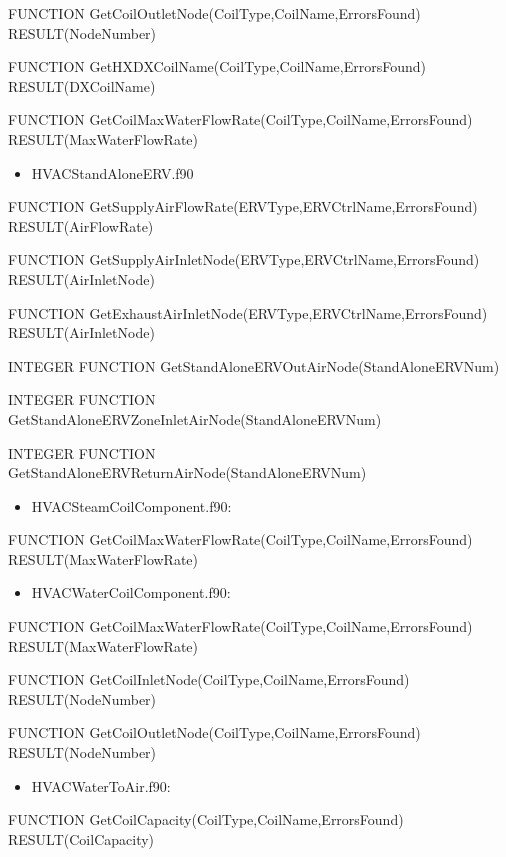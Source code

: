 FUNCTION GetCoilOutletNode(CoilType,CoilName,ErrorsFound) RESULT(NodeNumber)

FUNCTION GetHXDXCoilName(CoilType,CoilName,ErrorsFound) RESULT(DXCoilName)

FUNCTION GetCoilMaxWaterFlowRate(CoilType,CoilName,ErrorsFound) RESULT(MaxWaterFlowRate)

\begin{itemize}
\tightlist
\item
  HVACStandAloneERV.f90
\end{itemize}

FUNCTION GetSupplyAirFlowRate(ERVType,ERVCtrlName,ErrorsFound) RESULT(AirFlowRate)

FUNCTION GetSupplyAirInletNode(ERVType,ERVCtrlName,ErrorsFound) RESULT(AirInletNode)

FUNCTION GetExhaustAirInletNode(ERVType,ERVCtrlName,ErrorsFound) RESULT(AirInletNode)

INTEGER FUNCTION GetStandAloneERVOutAirNode(StandAloneERVNum)

INTEGER FUNCTION GetStandAloneERVZoneInletAirNode(StandAloneERVNum)

INTEGER FUNCTION GetStandAloneERVReturnAirNode(StandAloneERVNum)

\begin{itemize}
\tightlist
\item
  HVACSteamCoilComponent.f90:
\end{itemize}

FUNCTION GetCoilMaxWaterFlowRate(CoilType,CoilName,ErrorsFound) RESULT(MaxWaterFlowRate)

\begin{itemize}
\tightlist
\item
  HVACWaterCoilComponent.f90:
\end{itemize}

FUNCTION GetCoilMaxWaterFlowRate(CoilType,CoilName,ErrorsFound) RESULT(MaxWaterFlowRate)

FUNCTION GetCoilInletNode(CoilType,CoilName,ErrorsFound) RESULT(NodeNumber)

FUNCTION GetCoilOutletNode(CoilType,CoilName,ErrorsFound) RESULT(NodeNumber)

\begin{itemize}
\tightlist
\item
  HVACWaterToAir.f90:
\end{itemize}

FUNCTION GetCoilCapacity(CoilType,CoilName,ErrorsFound) RESULT(CoilCapacity)


